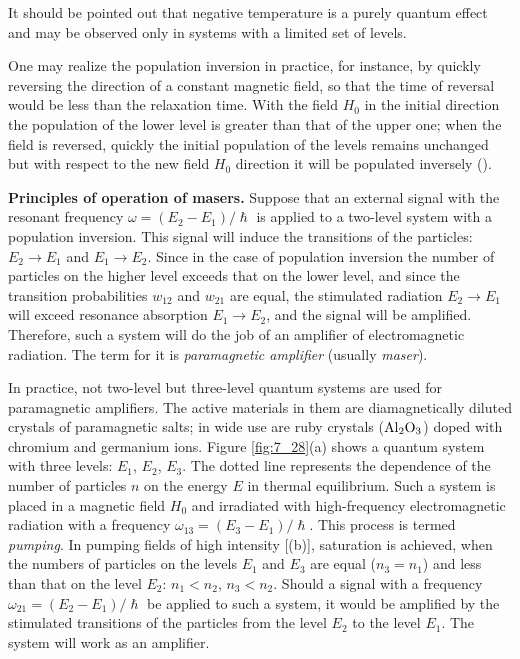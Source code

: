It should be pointed out that negative temperature is a purely quantum effect and may be observed only in systems with a limited set of levels.

One may realize the population inversion in practice, for instance, by quickly reversing the direction of a constant magnetic field, so that the time of reversal would be less than the relaxation time. With the field $H_0$ in the initial direction the population of the lower level is greater than that of the upper one; when the field is reversed, quickly the initial population of the levels remains unchanged but with respect to the new field $H_0$ direction it will be populated inversely ().

\textbf{Principles of operation of masers.} Suppose that an external signal with the resonant frequency $\omega=(E_2-E_1)/\hslash$ is applied to a two-level system with a population inversion. This signal will induce the transitions of the particles: $E_2\to E_1$ and $E_1\to E_2$. Since in the case of population inversion the number of particles on the higher level exceeds that on the lower level, and since the transition probabilities
$w_{12}$ and $w_{21}$ are equal, the stimulated radiation $E_2\to E_1$ will exceed resonance absorption $E_1\to E_2$, and the signal will be amplified. Therefore, such a system will do the job of an amplifier of electromagnetic radiation. The term for it is \textit{paramagnetic amplifier} (usually \textit{maser}).

In practice, not two-level but three-level quantum systems are used for paramagnetic amplifiers. The active materials in them are diamagnetically diluted crystals of paramagnetic salts; in wide use are ruby crystals ($\ce{Al2O3}$) doped with chromium and germanium ions. Figure \ref{fig:7_28}(a) shows a quantum system with three levels: $E_1$, $E_2$, $E_3$. The dotted line represents the dependence of the number of particles $n$ on the energy $E$ in thermal equilibrium. Such a system
is placed in a magnetic field $H_0$ and irradiated with high-frequency electromagnetic radiation with a frequency $\omega_{13}=(E_3-E_1)/\hslash$. This process is termed \textit{pumping}. In pumping fields of high intensity [(b)], saturation is achieved, when the numbers of particles on the levels $E_1$ and $E_3$ are equal ($n_3=n_1$) and less than that on the level $E_2$: $n_1<n_2$, $n_3<n_2$. Should a signal with a frequency $\omega_{21}=(E_2-E_1)/\hslash$ be applied to such a system, it would be amplified by the stimulated transitions of the particles from the level $E_2$ to the level $E_1$. The system will work as an amplifier.

